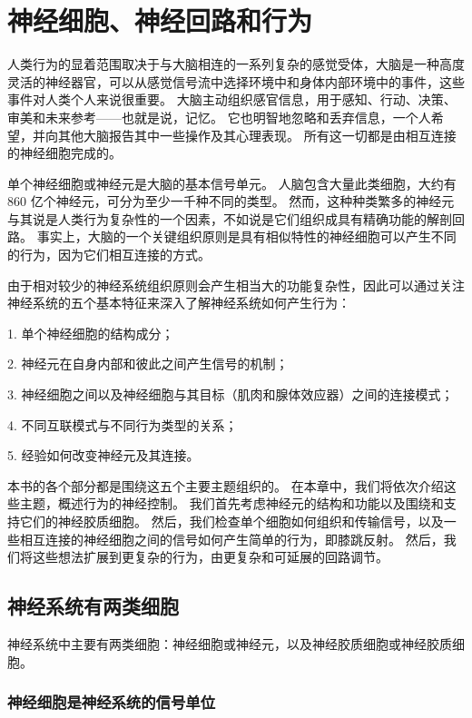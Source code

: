 \chapter{神经细胞、神经回路和行为} \label{chap:chap3}

人类行为的显着范围取决于与大脑相连的一系列复杂的感觉受体，大脑是一种高度灵活的神经器官，可以从感觉信号流中选择环境中和身体内部环境中的事件，这些事件对人类个人来说很重要。 
大脑主动组织感官信息，用于感知、行动、决策、审美和未来参考——也就是说，记忆。 
它也明智地忽略和丢弃信息，一个人希望，并向其他大脑报告其中一些操作及其心理表现。 
所有这一切都是由相互连接的神经细胞完成的。


单个神经细胞或神经元是大脑的基本信号单元。 
人脑包含大量此类细胞，大约有 860 亿个神经元，可分为至少一千种不同的类型。 
然而，这种种类繁多的神经元与其说是人类行为复杂性的一个因素，不如说是它们组织成具有精确功能的解剖回路。 
事实上，大脑的一个关键组织原则是具有相似特性的神经细胞可以产生不同的行为，因为它们相互连接的方式。


由于相对较少的神经系统组织原则会产生相当大的功能复杂性，因此可以通过关注神经系统的五个基本特征来深入了解神经系统如何产生行为：

1. 单个神经细胞的结构成分；

2. 神经元在自身内部和彼此之间产生信号的机制；

3. 神经细胞之间以及神经细胞与其目标（肌肉和腺体效应器）之间的连接模式；

4. 不同互联模式与不同行为类型的关系；

5. 经验如何改变神经元及其连接。

本书的各个部分都是围绕这五个主要主题组织的。 
在本章中，我们将依次介绍这些主题，概述行为的神经控制。 
我们首先考虑神经元的结构和功能以及围绕和支持它们的神经胶质细胞。 
然后，我们检查单个细胞如何组织和传输信号，以及一些相互连接的神经细胞之间的信号如何产生简单的行为，即膝跳反射。 
然后，我们将这些想法扩展到更复杂的行为，由更复杂和可延展的回路调节。


\section{神经系统有两类细胞}

神经系统中主要有两类细胞：神经细胞或神经元，以及神经胶质细胞或神经胶质细胞。

\subsection{神经细胞是神经系统的信号单位}

